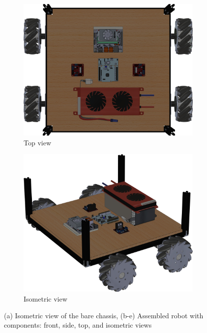 \begin{figure}[H]
  \begin{subfigure}[b]{0.3\textwidth}
    \centering
    \includegraphics[width=\textwidth]{imgs/top.png}
    \caption{Top view}
    \label{fig:robot_top}
  \end{subfigure}
  \hfill
  \begin{subfigure}[b]{0.3\textwidth}
    \centering
    \includegraphics[width=\textwidth]{imgs/iso.png}
    \caption{Isometric view}
    \label{fig:robot_iso}
  \end{subfigure}

  \caption{%
    (a) Isometric view of the bare chassis,
    (b-e) Assembled robot with components: front, side, top, and isometric views
  }
  \label{fig:robot_overview}
\end{figure}


